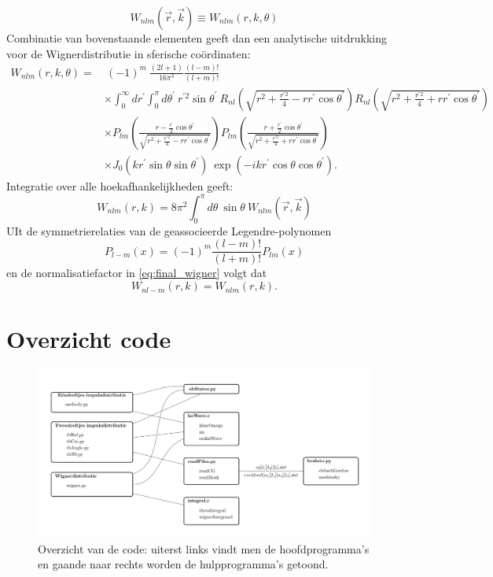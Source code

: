 \documentclass[11pt,twoside]{book}
\begin{document}
\begin{equation}
W_{nlm}(\vec{r},\vec{k}) \equiv W_{nlm}(r,k, \theta)
\end{equation}
Combinatie van bovenstaande elementen geeft dan een analytische uitdrukking voor de Wignerdistributie in sferische co\"{o}rdinaten:
\begin{align} \label{eq:final_wigner}
 W_{nlm}(r,k, \theta) = & \ (-1)^m \ \frac{(2l+1)}{16\pi^3}\frac{(l-m)!}{(l+m)!} & \nonumber \\ 
 & \times  \int^\infty_0 dr^\prime \int^\pi_0 d\theta^{\prime} \  r^{\prime 2} \sin \theta^\prime  \ R_{nl}\left(\sqrt{r^2+ \frac{r^{\prime 2}}{4} - r r^\prime \cos{\theta^\prime} }\right) R_{nl}\left(\sqrt{r^2+ \frac{r^{\prime 2}}{4} + r r^\prime  \cos{\theta^\prime}}\right) & \nonumber \\ 
 & \times P_{lm}\left(\frac{r - \frac{r^\prime}{2}\cos \theta^\prime}{\sqrt{r^2+ \frac{r^{\prime 2}}{4} - r r^\prime \cos{\theta^\prime}}} \right) P_{lm}\left(\frac{r + \frac{r^\prime}{2}\cos \theta^\prime}{\sqrt{r^2+ \frac{r^{\prime 2}}{4} + r r^\prime  \cos{\theta^\prime}}} \right) & \nonumber 
\\  & \times J_0(kr^\prime \sin \theta \sin \theta^\prime)\  \exp{(-ikr^\prime \cos \theta \cos \theta^\prime)}. & 
\end{align}
Integratie over alle hoekafhankelijkheden geeft:
\begin{equation} \label{eq:final_wigner2}
 W_{nlm}(r,k) = 8 \pi^2 \int^\pi_0 d\theta \ \sin \theta \ W_{nlm}(\vec{r},\vec{k})
\end{equation}
UIt de symmetrierelaties van de geassocieerde Legendre-polynomen 
\begin{equation}
P_{l-m}(x) = (-1)^m \frac{(l-m)!}{(l+m)!}  P_{lm}(x)
\end{equation}
en de normalisatiefactor in \eqref{eq:final_wigner} volgt dat
\begin{equation}
W_{nl-m}(r,k) = W_{nlm}(r,k).
\end{equation} 

\chapter{Overzicht code }

\begin{figure} 
\centering
\includegraphics[scale=0.5]{./figuren/code_overview.png}
\caption{Overzicht van de code: uiterst links vindt men de hoofdprogramma's en gaande naar rechts worden de hulpprogramma's getoond.}
\label{fig:overzicht}
\end{figure}
\end{document}
